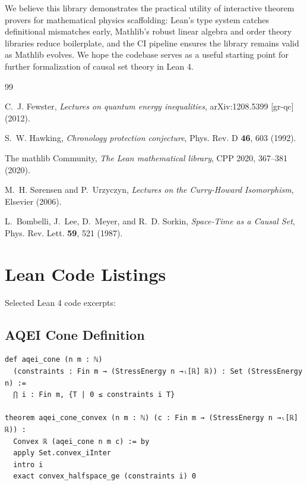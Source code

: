 \documentclass[12pt]{article}
\begin{document}
We believe this library demonstrates the practical utility of interactive theorem provers for mathematical physics scaffolding: Lean's type system catches definitional mismatches early, Mathlib's robust linear algebra and order theory libraries reduce boilerplate, and the CI pipeline ensures the library remains valid as Mathlib evolves. We hope the codebase serves as a useful starting point for further formalization of causal set theory in Lean 4.

\begin{thebibliography}{99}

C.~J. Fewster,
\textit{Lectures on quantum energy inequalities},
arXiv:1208.5399 [gr-qc] (2012).

S.~W. Hawking,
\textit{Chronology protection conjecture},
Phys. Rev. D \textbf{46}, 603 (1992).

The mathlib Community,
\textit{The Lean mathematical library},
CPP 2020, 367--381 (2020).

M.~H. S{\o}rensen and P.~Urzyczyn,
\textit{Lectures on the Curry-Howard Isomorphism},
Elsevier (2006).

L.~Bombelli, J.~Lee, D.~Meyer, and R.~D. Sorkin,
\textit{Space-Time as a Causal Set},
Phys. Rev. Lett. \textbf{59}, 521 (1987).

\end{thebibliography}

\appendix

\section{Lean Code Listings}

Selected Lean 4 code excerpts:

\subsection{AQEI Cone Definition}

\begin{verbatim}
def aqei_cone (n m : ℕ) 
  (constraints : Fin m → (StressEnergy n →ₗ[ℝ] ℝ)) : Set (StressEnergy n) :=
  ⋂ i : Fin m, {T | 0 ≤ constraints i T}
  
theorem aqei_cone_convex (n m : ℕ) (c : Fin m → (StressEnergy n →ₗ[ℝ] ℝ)) :
  Convex ℝ (aqei_cone n m c) := by
  apply Set.convex_iInter
  intro i
  exact convex_halfspace_ge (constraints i) 0
\end{verbatim}
\end{document}
